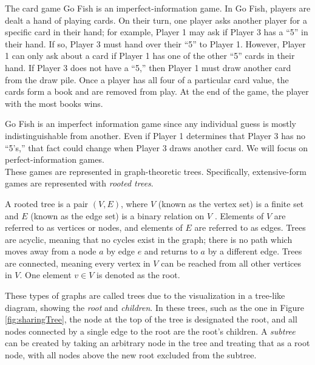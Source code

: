 \begin{exmp} The card game Go Fish is an imperfect-information game. In Go Fish, players are dealt a hand of playing cards. On their turn, one player asks another player for a specific card in their hand; for example, Player 1 may ask if Player 3 has a ``5'' in their hand. If so, Player 3 must hand over their ``5'' to Player 1. However, Player 1 can only ask about a card if Player 1 has one of the other ``5'' cards in their hand. If Player 3 does not have a ``5,'' then Player 1 must draw another card from the draw pile. Once a player has all four of a particular card value, the cards form a book and are removed from play. At the end of the game, the player with the most books wins.
\end{exmp}
Go Fish is an imperfect information game since any individual guess is mostly indistinguishable from another. Even if Player 1 determines that Player 3 has no ``5's,'' that fact could change when Player 3 draws another card. We will focus on perfect-information games.\\

These games are represented in graph-theoretic trees. Specifically, extensive-form games are represented with \textit{rooted trees}.
\begin{define}
  A rooted tree is a pair $(V, E)$, where $V$ (known as the vertex set) is a finite set and $E$ (known as the edge set) is a binary relation on $V$ \cite{corm09}. Elements of $V$ are referred to as vertices or nodes, and elements of $E$ are referred to as edges. Trees are acyclic, meaning that no cycles exist in the graph; there is no path which moves away from a node $a$ by edge $e$ and returns to $a$ by a different edge. Trees are connected, meaning every vertex in $V$ can be reached from all other vertices in $V$. One element $v\in V$ is denoted as the root.
\end{define}

These types of graphs are called trees due to the visualization in a tree-like diagram, showing the \textit{root} and \textit{children}. In these trees, such as the one in Figure \ref{fig:sharingTree}, the node at the top of the tree is designated the root, and all nodes connected by a single edge to the root are the root's children. A \textit{subtree} can be created by taking an arbitrary node in the tree and treating that as a root node, with all nodes above the new root excluded from the subtree.\\

